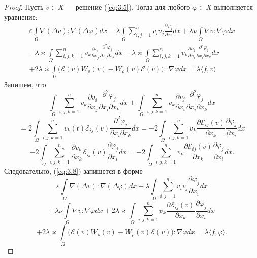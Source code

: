 \begin{proof}
Пусть $v \in X$ --- решение (\ref{eq:3.5}). Тогда для любого $\varphi\in  X$ выполняется уравнение:
\begin{equation}\label{eq:3.8}
    \begin{gathered}
        \varepsilon\int\limits_{\Omega}\nabla (\Delta v):\nabla (\Delta\varphi)dx - \lambda\int\limits_{\Omega}\sum_{i,j=1}^n v_iv_j
        \frac{\partial\varphi_j}{\partial x_i}dx +\lambda\nu\int\limits_{\Omega}\nabla v : \nabla\varphi dx \\
        -\lambda\varkappa\int\limits_{\Omega}\sum_{i,j,k=1}^n v_k\frac{\partial v_i}{\partial x_j}\frac{\partial^2 \varphi_j}{\partial x_i\partial x_k}dx 
        -\lambda\varkappa\int\limits_{\Omega}\sum_{i,j,k=1}^n v_k\frac{\partial v_j}{\partial x_i}\frac{\partial^2 \varphi_j}{\partial x_i\partial x_k}dx \\
        +2\lambda\varkappa\int\limits_{\Omega}\bigg(\mathcal{E}(v)W_{\rho}(v)-W_{\rho}(v)\mathcal{E}(v)\bigg): \ \nabla\varphi dx=\lambda\langle f, v\rangle
    \end{gathered}
\end{equation}
    Запишем, что  
    $$\int\limits_{\Omega}\sum_{i,j,k=1}^n v_k\frac{\partial v_i}{\partial x_j}\frac{\partial^2 \varphi_j}{\partial x_i\partial x_k}dx+
    \int\limits_{\Omega}\sum_{i,j,k=1}^n v_k\frac{\partial v_j}{\partial x_i}\frac{\partial^2 \varphi_j}{\partial x_i\partial x_k}dx $$
    $$= 2\int\limits_{\Omega}\sum_{i,j,k=1}^n v_k(t)\mathcal{E}_{ij}(v)\frac{\partial^2 \varphi_j}{\partial x_i\partial x_k}dx=-2
    \int\limits_{\Omega}\sum_{i,j,k=1}^n v_k\frac{\partial\mathcal{E}_{ij}(v)}{\partial x_k}\frac{\partial\varphi_j}{\partial x_i}dx $$
    $$-2\int\limits_{\Omega}\sum_{i,j,k=1}^n\frac{\partial v_k}{\partial x_k}\mathcal{E}_{ij}(v)\frac{\partial\varphi_j}{\partial x_i}dx
    =-2\int\limits_{\Omega}\sum_{i,j,k=1}^n v_k \frac{\partial\mathcal{E}_{ij}(v)}{\partial x_k}\frac{\partial\varphi_j}{\partial x_i}dx.$$
    Следовательно, (\ref{eq:3.8}) запишется в форме
    $$\varepsilon\int\limits_{\Omega}\nabla(\Delta v):\nabla(\Delta\varphi)dx-\lambda\int\limits_{\Omega}\sum_{i,j=1}^n v_iv_j\frac{\partial\varphi_j}{\partial x_i}dx$$
    $$+\lambda\nu\int\limits_{\Omega}\nabla v:\nabla\varphi dx+2\lambda\varkappa\int\limits_{\Omega}\sum_{i,j,k=1}^n v_k\frac{\partial\mathcal{E}_{ij}(v)}{\partial x_k}\frac{\partial\varphi_j}{\partial x_i}dx$$
    $$+2\lambda\varkappa\int\limits_{\Omega}\bigg(\mathcal{E}(v)W_{\rho}(v)-W_{\rho}(v)\mathcal{E}(v)\bigg):\nabla\varphi dx=\lambda\langle f, \varphi\rangle.$$

\end{proof}
